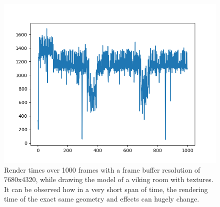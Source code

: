 \begin{figure}[hbt!]
    \centering
    \includegraphics[width=1.0\textwidth]{figuras/vulkan-7680x4320viking_room-textures-frametimes.png}
    \caption{Render times over 1000 frames with a frame buffer resolution of 7680x4320, while drawing the model of a viking room with textures. It can be observed how in a very short span of time, the rendering time of the exact same geometry and effects can hugely change.}
    \label{vulkan-7680x4320viking_room-textures-frametimes}
\end{figure}

